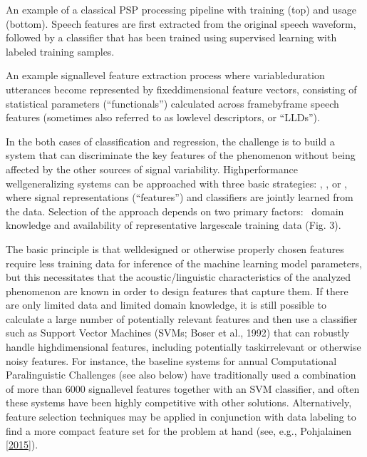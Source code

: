 \documentclass[letterpaper,10pt,english]{jupyterBook}
\begin{document}
\sphinxAtStartPar
{}

\sphinxAtStartPar
{} An example of a classical PSP processing pipeline with
training (top) and usage (bottom). Speech features are first extracted
from the original speech waveform, followed by a classifier that has
been trained using supervised learning with labeled training samples.

\sphinxAtStartPar
{}

\sphinxAtStartPar
{} An example signal\sphinxhyphen{}level feature extraction process where
variable\sphinxhyphen{}duration utterances become represented by fixed\sphinxhyphen{}dimensional
feature vectors, consisting of statistical parameters (“functionals”)
calculated across frame\sphinxhyphen{}by\sphinxhyphen{}frame speech features (sometimes also
referred to as low\sphinxhyphen{}level descriptors, or “LLDs”).

\sphinxAtStartPar
In the both cases of classification and regression, the challenge is to
build a system that can discriminate the key features of the phenomenon
without being affected by the other sources of signal variability.
High\sphinxhyphen{}performance well\sphinxhyphen{}generalizing systems can be approached with three
basic strategies: , , or
, where signal representations (“features”) and
classifiers are jointly learned from the data. Selection of the approach
depends on two primary factors:  domain knowledge and availability of
representative large\sphinxhyphen{}scale training data (Fig. 3).

\sphinxAtStartPar
The basic principle is that well\sphinxhyphen{}designed or otherwise properly chosen
features require less training data for inference of the machine
learning model parameters, but this necessitates that the
acoustic/linguistic characteristics of the analyzed phenomenon are known
in order to design features that capture them. If there are only limited
data and limited domain knowledge, it is still possible to calculate a
large number of potentially relevant features and then use a classifier
such as Support Vector Machines (SVMs; Boser et al., 1992) that can
robustly handle high\sphinxhyphen{}dimensional features, including potentially
task\sphinxhyphen{}irrelevant or otherwise noisy features. For instance, the baseline
systems for annual Computational Paralinguistic Challenges (see also
below) have traditionally used a combination of more than 6000
signal\sphinxhyphen{}level features together with an SVM classifier, and often these
systems have been highly competitive with other solutions.
Alternatively, feature selection techniques may be applied in
conjunction with data labeling to find a more compact feature set for
the problem at hand (see, e.g., Pohjalainen  {[}\hyperlink{cite.References:id9}{2015}{]}).
\end{document}
